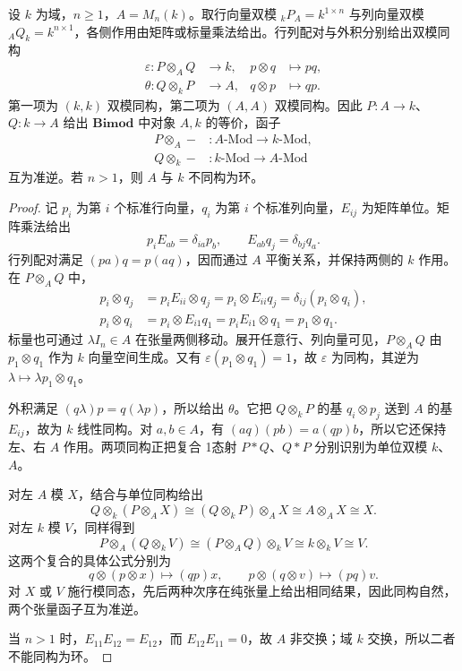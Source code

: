 \begin{proposition}\label{b4:prop:F-matrix-bimodule-equivalence}
	设 \(k\) 为域，\(n\geq1\)，\(A=M_n(k)\)。取行向量双模 \({}_kP_A=k^{1\times n}\) 与列向量双模 \({}_AQ_k=k^{n\times1}\)，各侧作用由矩阵或标量乘法给出。行列配对与外积分别给出双模同构
	\[
		\begin{aligned}
			\varepsilon:P\otimes_A Q&\longrightarrow k, &p\otimes q&\longmapsto pq,\\
			\theta:Q\otimes_k P&\longrightarrow A, &q\otimes p&\longmapsto qp.
		\end{aligned}
	\]
	第一项为 \((k,k)\) 双模同构，第二项为 \((A,A)\) 双模同构。因此 \(P:A\rightarrow k\)、\(Q:k\rightarrow A\) 给出 \(\mathbf{Bimod}\) 中对象 \(A,k\) 的等价，函子
	\[
		\begin{aligned}
			P\otimes_A- &: A\text{-}\mathrm{Mod}\longrightarrow k\text{-}\mathrm{Mod},\\
			Q\otimes_k- &: k\text{-}\mathrm{Mod}\longrightarrow A\text{-}\mathrm{Mod}
		\end{aligned}
	\]
	互为准逆。若 \(n>1\)，则 \(A\) 与 \(k\) 不同构为环。
\end{proposition}
\begin{proof}
	记 \(p_i\) 为第 \(i\) 个标准行向量，\(q_i\) 为第 \(i\) 个标准列向量，\(E_{ij}\) 为矩阵单位。矩阵乘法给出
	\[
		p_iE_{ab}=\delta_{ia}p_b, \qquad E_{ab}q_j=\delta_{bj}q_a.
	\]
	行列配对满足 \((pa)q=p(aq)\)，因而通过 \(A\) 平衡关系，并保持两侧的 \(k\) 作用。在 \(P\otimes_A Q\) 中，
	\[
		\begin{aligned}
			p_i\otimes q_j &=p_iE_{ii}\otimes q_j =p_i\otimes E_{ii}q_j =\delta_{ij}(p_i\otimes q_i),\\
			p_i\otimes q_i &=p_i\otimes E_{i1}q_1 =p_iE_{i1}\otimes q_1 =p_1\otimes q_1.
		\end{aligned}
	\]
	标量也可通过 \(\lambda I_n\in A\) 在张量两侧移动。展开任意行、列向量可见，\(P\otimes_A Q\) 由 \(p_1\otimes q_1\) 作为 \(k\) 向量空间生成。又有 \(\varepsilon(p_1\otimes q_1)=1\)，故 \(\varepsilon\) 为同构，其逆为 \(\lambda\mapsto\lambda p_1\otimes q_1\)。

	外积满足 \((q\lambda)p=q(\lambda p)\)，所以给出 \(\theta\)。它把 \(Q\otimes_k P\) 的基 \(q_i\otimes p_j\) 送到 \(A\) 的基 \(E_{ij}\)，故为 \(k\) 线性同构。对 \(a,b\in A\)，有 \((aq)(pb)=a(qp)b\)，所以它还保持左、右 \(A\) 作用。两项同构正把复合 1态射 \(P*Q\)、\(Q*P\) 分别识别为单位双模 \(k\)、\(A\)。

	对左 \(A\) 模 \(X\)，结合与单位同构给出
	\[
		Q\otimes_k(P\otimes_A X) \cong(Q\otimes_k P)\otimes_A X \cong A\otimes_A X \cong X.
	\]
	对左 \(k\) 模 \(V\)，同样得到
	\[
		P\otimes_A(Q\otimes_k V) \cong(P\otimes_A Q)\otimes_k V \cong k\otimes_k V \cong V.
	\]
	这两个复合的具体公式分别为
	\[
		q\otimes(p\otimes x)\longmapsto(qp)x, \qquad p\otimes(q\otimes v)\longmapsto(pq)v.
	\]
	对 \(X\) 或 \(V\) 施行模同态，先后两种次序在纯张量上给出相同结果，因此同构自然，两个张量函子互为准逆。

	当 \(n>1\) 时，\(E_{11}E_{12}=E_{12}\)，而 \(E_{12}E_{11}=0\)，故 \(A\) 非交换；域 \(k\) 交换，所以二者不能同构为环。
\end{proof}
